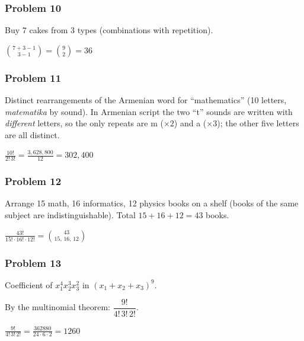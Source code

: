 \subsubsection*{Problem 10}
Buy 7 cakes from 3 types (combinations with repetition).

$\boxed{\binom{7+3-1}{3-1} = \binom{9}{2} = 36}$

\subsubsection*{Problem 11}
Distinct rearrangements of the Armenian word for ``mathematics'' (10 letters, \textit{matematika} by sound). In Armenian script the two ``t'' sounds are written with \emph{different} letters, so the only repeats are m ($\times 2$) and a ($\times 3$); the other five letters are all distinct.

$\boxed{\frac{10!}{2!\,3!} = \frac{3{,}628{,}800}{12} = 302{,}400}$

\subsubsection*{Problem 12}
Arrange 15 math, 16 informatics, 12 physics books on a shelf (books of the same subject are indistinguishable). Total $15+16+12=43$ books.

$\boxed{\frac{43!}{15!\cdot 16!\cdot 12!} = \binom{43}{15,\,16,\,12}}$

\subsubsection*{Problem 13}
Coefficient of $x_1^4 x_2^3 x_3^2$ in $(x_1+x_2+x_3)^9$.

By the multinomial theorem: $\dfrac{9!}{4!\,3!\,2!}$.

$\boxed{\frac{9!}{4!\,3!\,2!} = \frac{362880}{24\cdot 6\cdot 2} = 1260}$
